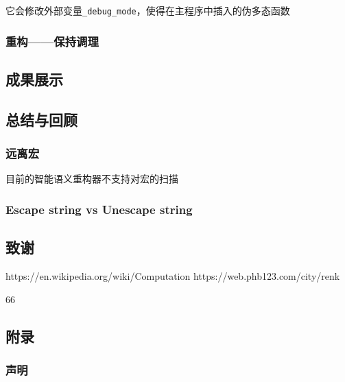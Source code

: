 它会修改外部变量\texttt{\_debug\_mode}，使得在主程序中插入的伪多态函数

\hypertarget{ux91cdux6784ux4fddux6301ux8c03ux7406}{%
\subsubsection{重构------保持调理}\label{ux91cdux6784ux4fddux6301ux8c03ux7406}}

\hypertarget{ux6210ux679cux5c55ux793a}{%
\subsection{成果展示}\label{ux6210ux679cux5c55ux793a}}

\hypertarget{ux603bux7ed3ux4e0eux56deux987e}{%
\subsection{总结与回顾}\label{ux603bux7ed3ux4e0eux56deux987e}}

\hypertarget{ux8fdcux79bbux5b8f}{%
\subsubsection{远离宏}\label{ux8fdcux79bbux5b8f}}

目前的智能语义重构器不支持对宏的扫描

\hypertarget{escape-string-vs-unescape-string}{%
\subsubsection{Escape string vs Unescape
string}\label{escape-string-vs-unescape-string}}

\hypertarget{ux81f4ux8c22}{%
\subsection{致谢}\label{ux81f4ux8c22}}

https://en.wikipedia.org/wiki/Computation
https://web.phb123.com/city/renk

66

\hypertarget{ux9644ux5f55}{%
\subsection{附录}\label{ux9644ux5f55}}

\hypertarget{ux58f0ux660e}{%
\subsubsection{声明}\label{ux58f0ux660e}}

